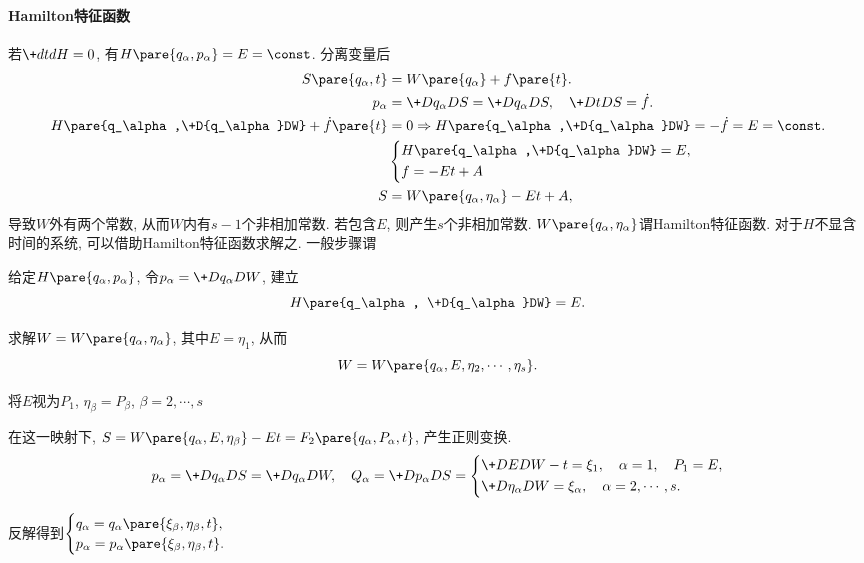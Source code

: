 \documentclass{ctexart}
\begin{document}
\paragraph{Hamilton特征函数} %
\label{par:hamilton特征函数}

若$\+dtdH = 0$, 有$H\pare{q_\alpha,p_\alpha} = E = \const$. 分离变量后
\begin{align*}
    S\pare{q_\alpha,t} &= W\pare{q_\alpha} + f\pare{t}. \\
    p_\alpha &= \+D{q_\alpha}DS = \+D{q_\alpha}DS,\quad \+DtDS = \dot{f}. \\
    H\pare{q_\alpha,\+D{q_\alpha}DW} + \dot{f}\pare{t} &= 0 \Rightarrow H\pare{q_\alpha,\+D{q_\alpha}DW} = -\dot{f} = E = \const. \\
    & \left\{\begin{aligned}
        & H\pare{q_\alpha,\+D{q_\alpha}DW} = E, \\
        & f = -Et + A
    \end{aligned}\right. \\
    S &= W\pare{q_\alpha,\eta_\alpha} - Et + A,
\end{align*}
导致$W$外有两个常数, 从而$W$内有$s-1$个非相加常数. 若包含$E$, 则产生$s$个非相加常数. $W\pare{q_\alpha,\eta_\alpha}$谓Hamilton特征函数. 对于$H$不显含时间的系统, 可以借助Hamilton特征函数求解之. 一般步骤谓
\begin{cenum}
    \item 给定$H\pare{q_\alpha,p_\alpha}$, 令$p_\alpha = \displaystyle \+D{q_\alpha}DW$, 建立
    \[ H\pare{q_\alpha, \+D{q_\alpha}DW} = E. \]
    \item 求解$W = W\pare{q_\alpha,\eta_\alpha}$, 其中$E = \eta_1$, 从而
    \[ W = W\pare{q_\alpha,E,\eta_2,\cdots,\eta_s}. \]
    \item 将$E$视为$P_1$, $\eta_\beta = P_\beta$, $\beta = 2,\cdots,s$
    \item 在这一映射下, $S = W\pare{q_\alpha,E,\eta_\beta} - Et = F_2\pare{q_\alpha,P_\alpha,t}$, 产生正则变换.
    \[ p_\alpha = \+D{q_\alpha}DS = \+D{q_\alpha}DW,\quad Q_\alpha = \+D{p_\alpha}DS = \left\{\begin{aligned}
        &\+DEDW - t = \xi_1,\quad \alpha=1,\quad P_1 = E, \\
        &\+D{\eta_\alpha}DW = \xi_\alpha,\quad \alpha = 2,\cdots, s.
    \end{aligned}\right. \]
    \item 反解得到$\displaystyle \begin{cases}
        q_\alpha = q_\alpha\pare{\xi_\beta,\eta_\beta,t}, \\
        p_\alpha = p_\alpha\pare{\xi_\beta,\eta_\beta,t}.
    \end{cases}$
\end{cenum}
\end{document}
